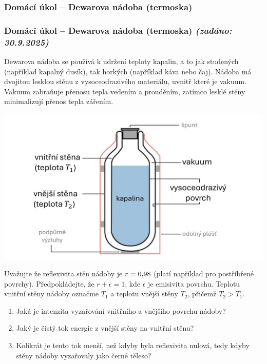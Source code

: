 \documentclass[a4paper,11pt,twoside]{article}
\newenvironment{homework}{}{}
\newcommand{\np}{\clearpage\newpage}
\newcommand{\exercise}[2][]{\ifthenelse{\isempty{#1}}
	{\np\thispagestyle{empty}\subsubsection*{Domácí úkol -- #2}}
	{\np\thispagestyle{empty}\np\subsubsection*{Domácí úkol -- #2 \small{\it{(zadáno: {#1})}}}}
}
\begin{document}
\begin{homework}
	\exercise[30.9.2025]{Dewarova nádoba (termoska)}
		Dewarova nádoba se používá k udržení teploty kapalin, a to jak studených (například kapalný dusík), tak horkých (například káva nebo čaj).
		Nádoba má dvojitou lesklou stěnu z vysoceodrazivého materiálu, uvnitř které je vakuum.
		Vakuum zabraňuje přenosu tepla vedením a prouděním, zatímco lesklé stěny minimalizují přenos tepla zářením.

		\begin{center}
			\includegraphics[width=0.8\linewidth]{Dewarka.png}
		\end{center}

		Uvažujte že reflexivita stěn nádoby je $r=0,\!98$ (platí například pro postříbřené povrchy).
		Předpokládejte, že $r+\epsilon=1$, kde $\epsilon$ je emisivita povrchu.
		Teplotu vnitřní stěny nádoby označme $T_{1}$ a teplotu vnější stěny $T_{2}$, přičemž $T_{2}>T_{1}$.

		\begin{enumerate}
			\item
				Jaká je intenzita vyzařování vnitřního a vnějšího povrchu nádoby?

			\item
				Jaký je čistý tok energie z vnější stěny na vnitřní stěnu?

			\item
				Kolikrát je tento tok menší, než kdyby byla reflexivita nulová, tedy kdyby stěny nádoby vyzařovaly jako černé těleso?
		\end{enumerate}
	\end{homework}
\end{document}
